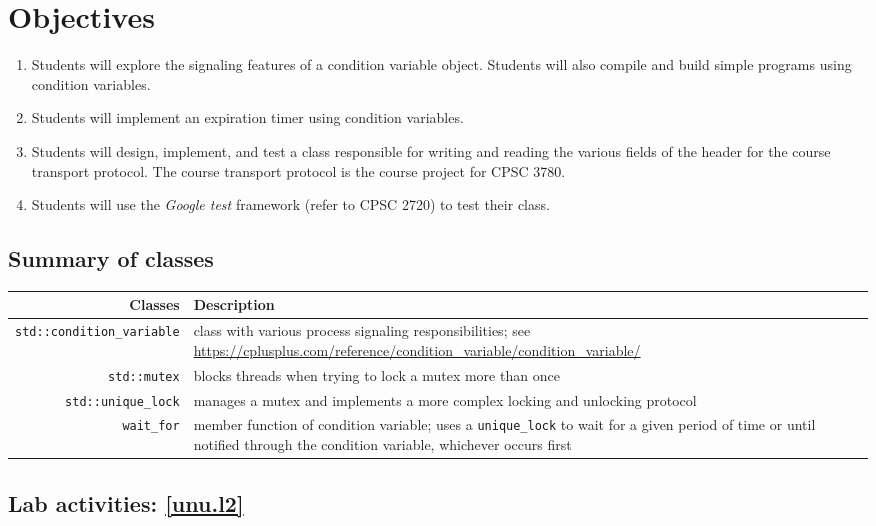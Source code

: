 \documentclass[12pt]{book}
\begin{document}
\section{Objectives}

\begin{enumerate}[label=Objective \arabic*:]
\item\label{unu.l2} Students will explore the signaling features of a condition variable object. Students will also compile and build simple programs using condition variables. 
\item\label{doi.l2} Students will implement an expiration timer using condition variables.
\item\label{trei.l2} Students will design, implement, and test a class responsible for writing and reading the various fields of the header for the course transport protocol. The course transport protocol is the course project for CPSC 3780.
\item\label{patru.l2} Students will use the \emph{Google test} framework (refer to CPSC 2720) to test their class.

\end{enumerate}

\subsection{Summary of classes}

\begin{tabularx}{\textwidth}{r  X}
  Classes & Description \\ \midrule
  \lstinline$std::condition_variable$ & class with various process signaling responsibilities; see \url{https://cplusplus.com/reference/condition_variable/condition_variable/} \\
  \lstinline$std::mutex$ & blocks threads  when trying to lock a mutex more than once\\
  \lstinline$std::unique_lock$ & manages a mutex and implements a more complex locking and unlocking protocol \\
  \lstinline$wait_for$ & member function of condition variable; uses a \lstinline$unique_lock$ to wait for a given period of time or until notified through the condition variable, whichever occurs first
\end{tabularx}


\subsection{Lab activities: \ref{unu.l2}}
\end{document}
